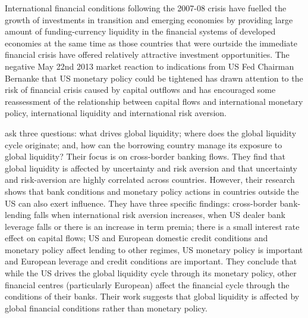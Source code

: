 \documentclass[12pt, a4paper, oneside]{article} %
\begin{document}

International financial conditions following the 2007-08 crisis have fuelled the growth of investments in transition and emerging economies by providing large amount of funding-currency liquidity in the financial systems of developed economies at the same time as those countries that were ourtside the immediate financial crisis have offered relatively attractive investment opportunities.   The negative May 22nd 2013 market reaction to indications from US Fed Chairman Bernanke that US monetary policy could be tightened has drawn attention to the risk of financial crisis caused by capital outflows and has encouraged some reassessment of the relationship between capital flows and international monetary policy, international liquidity and international risk aversion.  

\citet{Cerutti2014} ask three questions:  what drives global liquidity; where does the global liquidity cycle originate; and, how can the borrowing country manage its exposure to global liquidity? Their focus is on cross-border banking flows. They find that global liquidity is affected by uncertainty and risk aversion and that uncertainty and risk-aversion are highly correlated across countries. However, their research shows that bank conditions and monetary policy actions in countries outside the US can also exert influence. They have three specific findings:  cross-border bank-lending falls when international risk aversion increases, when US dealer bank leverage falls or there is an increase in term premia; there is a small interest rate effect on capital flows; US and European domestic credit conditions and monetary policy affect lending to other regimes, US monetary policy is important and European leverage and credit conditions are important.  They conclude that while the US drives the global liquidity cycle through its monetary policy, other financial centres (particularly European) affect the financial cycle through the conditions of their banks. Their work suggests that global liquidity is affected by global financial conditions rather than monetary policy.
\end{document}
